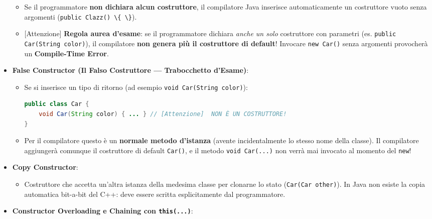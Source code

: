 \documentclass[11pt,a4paper,oneside]{report}
\newcommand{\passthrough}[1]{#1}
\providecommand{\tightlist}{\setlength{\itemsep}{0pt}\setlength{\parskip}{0pt}}
\begin{document}
\begin{itemize}
  \begin{itemize}
  \tightlist
  \item
    Se il programmatore \textbf{non dichiara alcun costruttore}, il
    compilatore Java inserisce automaticamente un costruttore vuoto
    senza argomenti (\passthrough{\lstinline!public Clazz() \{ \}!}).
  \item
    {[}Attenzione{]} \textbf{Regola aurea d'esame}: se il programmatore
    dichiara \emph{anche un solo} costruttore con parametri (es.
    \passthrough{\lstinline!public Car(String color)!}), il compilatore
    \textbf{non genera più il costruttore di default}! Invocare
    \passthrough{\lstinline!new Car()!} senza argomenti provocherà un
    \textbf{Compile-Time Error}.
  \end{itemize}
\item
  \textbf{False Constructor (Il Falso Costruttore --- Trabocchetto
  d'Esame)}:

  \begin{itemize}
  \item
    Se si inserisce un tipo di ritorno (ad esempio
    \passthrough{\lstinline!void Car(String color)!}):

\begin{lstlisting}[language=Java]
public class Car {
    void Car(String color) { ... } // [Attenzione]  NON È UN COSTRUTTORE!
}
\end{lstlisting}
  \item
    Per il compilatore questo è un \textbf{normale metodo d'istanza}
    (avente incidentalmente lo stesso nome della classe). Il compilatore
    aggiungerà comunque il costruttore di default
    \passthrough{\lstinline!Car()!}, e il metodo
    \passthrough{\lstinline!void Car(...)!} non verrà mai invocato al
    momento del \passthrough{\lstinline!new!}!
  \end{itemize}
\item
  \textbf{Copy Constructor}:

  \begin{itemize}
  \tightlist
  \item
    Costruttore che accetta un'altra istanza della medesima classe per
    clonarne lo stato (\passthrough{\lstinline!Car(Car other)!}). In
    Java non esiste la copia automatica bit-a-bit del C++: deve essere
    scritta esplicitamente dal programmatore.
  \end{itemize}
\item
  \textbf{Constructor Overloading e Chaining con
  \passthrough{\lstinline!this(...)!}}:


\end{itemize}
\end{document}
